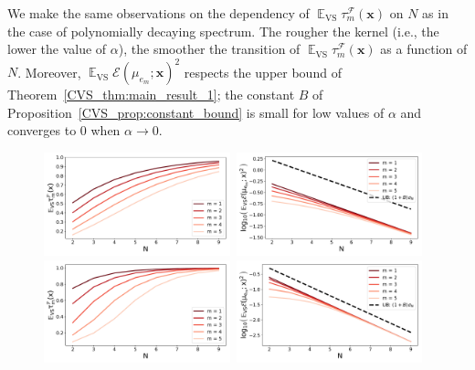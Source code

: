 \documentclass[twoside,11pt]{book}
\numberwithin{theorem}{chapter}
\numberwithin{definition}{chapter}
\numberwithin{proposition}{chapter}
\numberwithin{corollary}{chapter}
\numberwithin{example}{chapter}
\numberwithin{lemma}{chapter}
\numberwithin{assumption}{chapter}
\numberwithin{equation}{chapter}
\numberwithin{figure}{chapter}
\DeclareMathOperator{\VS}{\mathrm{VS}}
\DeclareMathOperator{\EX}{\mathbb{E}}
\DeclareMathOperator{\F}{\mathcal{F}}
\begin{document}
We make the same observations on the dependency of $\EX_{\VS} \tau_{m}^{\F}(\bm{x})$ on $N$ as in the case of polynomially decaying spectrum. The rougher the kernel (i.e., the lower the value of $\alpha$), the smoother the transition of $\EX_{\VS} \tau_{m}^{\F}(\bm{x})$ as a function of $N$. Moreover, $\EX_{\VS} \mathcal{E}(\mu_{e_{m}};\bm{x})^{2}$ respects the upper bound of Theorem~\ref{CVS_thm:main_result_1};
the constant $B$ of Proposition~\ref{CVS_prop:constant_bound} is small for low values of $\alpha$ and converges to $0$ when $\alpha \rightarrow 0$.

\begin{figure}[h]\label{CVS_fig:gaussian}
    \centering
\includegraphics[width= 0.48\textwidth]{img/icml/app/EX_VS_tau_n_alpha_07.pdf}~\includegraphics[width= 0.48\textwidth]{img/icml/app/EX_VS_err_n_alpha_07_new.pdf}\\
\includegraphics[width= 0.48\textwidth]{img/icml/app/EX_VS_tau_n_alpha_05.pdf}~\includegraphics[width= 0.48\textwidth]{img/icml/app/EX_VS_err_n_alpha_05_new.pdf}\\

\end{figure}
\end{document}

